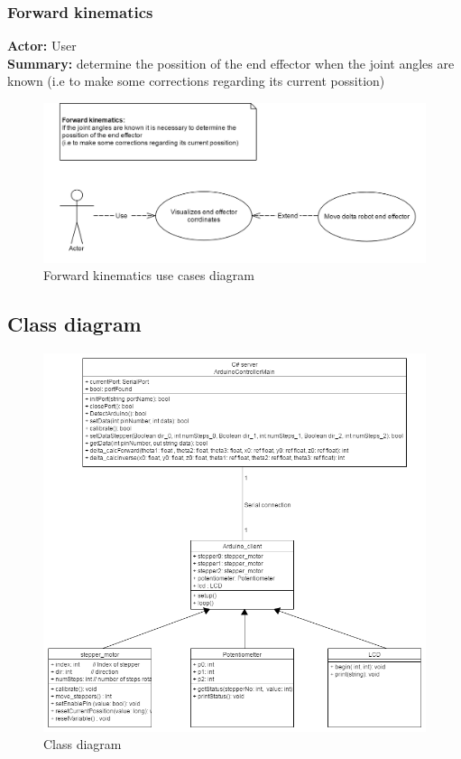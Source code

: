 \subsubsection{Forward kinematics}
\textbf{Actor:} User \\
\textbf{Summary:} determine the possition of the end effector when the joint angles are known  
(i.e to make some corrections regarding its current possition)
\begin{figure}[H]
	\centering
	\includegraphics[width=\maxwidth{15cm}, keepaspectratio]{Chapters/Fig/usecase_forward_kinematics.png}
	\caption{Forward kinematics use cases diagram}
	\label{fig:usecase_forward_kinematics}
\end{figure}

\subsection{Class diagram}

\begin{figure}[H]
	\centering
	\includegraphics[width=\maxwidth{15cm}, keepaspectratio]{Chapters/Fig/class_diagram.png}
	\caption{Class diagram}
	\label{fig:class_diagram}
\end{figure}

